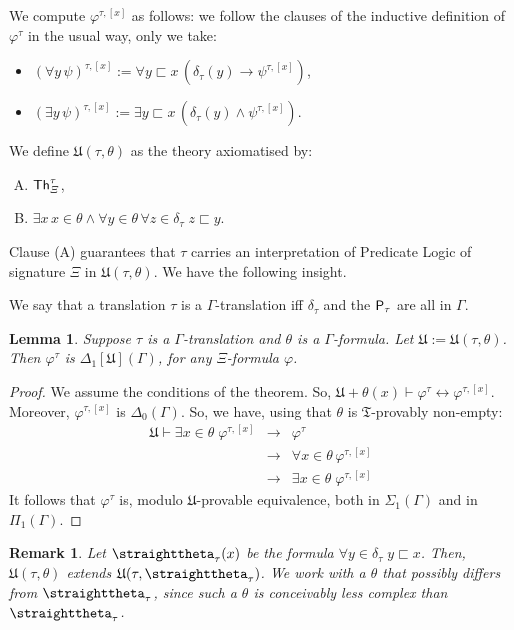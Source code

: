 \documentclass{amsart}
\renewcommand{\iff}{\leftrightarrow}
\renewcommand{\phi}{\varphi}
\renewcommand{\Xi}{\varXi}
\renewcommand{\Gamma}{\varGamma}
\newtheorem{lem}[theorem]{Lemma}
\newtheorem{rem}[theorem]{Remark}
\newcommand{\bin}{\mathbin{\in}}
\newcommand{\mf}[1]{{\mathfrak {#1}}}
\newcommand{\below}[2]{#1\sqsubset #2}
\newcommand{\bbelow}[2]{#1\mathop{\sqsubset}#2}
\newcommand{\contheta}{\text{\textup\straighttheta}}
\newcommand{\fol}[1]{{\sf Th}_{#1}}
\begin{document}
We compute $\phi^{\tau,[x]}$ as follows: we follow the clauses of the inductive definition
of $\phi^\tau$ in the usual way, only we take:
\begin{itemize}
    \item $(\forall y\,\psi)^{\tau,[x]} := \forall \bbelow yx\,(\delta_\tau(y) \to \psi^{\tau,[x]})$,
    \item $(\exists y\,\psi)^{\tau,[x]} := \exists \bbelow yx\,(\delta_\tau(y) \wedge \psi^{\tau,[x]})$.
\end{itemize}

We define $\mf U(\tau,\theta)$ as the theory axiomatised by:
\begin{enumerate}[A.]
    \item $\fol\Xi^\tau$,
    \item $ \exists x\, x\in\theta \wedge
    \forall  y \bin \theta\, \forall  z\bin \delta_\tau \; \below zy$. 
\end{enumerate}

Clause (A) guarantees that $\tau$ carries an interpretation of Predicate Logic of signature $\Xi$ in $\mf U(\tau,\theta)$.
We have the following insight.

We say that a translation $\tau$ is a $\Gamma$-translation iff $\delta_\tau$ and the ${\sf P}_\tau$
are all in $\Gamma$.
\begin{lem}\label{bescheidensmurf}
Suppose $\tau$ is a $\Gamma$-translation and $\theta$ is a $\Gamma$-formula.
Let $\mf U:= \mf U(\tau,\theta)$.
Then $\phi^\tau$ is $\Delta_1[\mf U](\Gamma)$, for any $\Xi$-formula $\phi$.
\end{lem}

\begin{proof}
    We assume the conditions of the theorem. So,
    $\mf U + \theta(x) \vdash \phi^{\tau}\iff \phi^{\tau,[x]}$. Moreover,
    $\phi^{\tau,[x]}$ is $\Delta_0(\Gamma)$. 
So, we have, using that $\theta$ is $\mf T$-provably non-empty:
\begin{eqnarray*}
    \mf U \vdash  \exists x \bin \theta\;  \phi^{\tau,[x]} & \to & \phi^\tau \\
    & \to & \forall x\bin \theta\,  \phi^{\tau,[x]} \\
    & \to &  \exists  x\bin\theta \;  \phi^{\tau,[x]}
\end{eqnarray*}
It follows that $\phi^\tau$ is, modulo $\mf U$-provable equivalence, both in $\Sigma_1(\Gamma)$ and in $\Pi_1(\Gamma)$.
\end{proof}

\begin{rem}
    Let   $\contheta_\tau(x)$ be the formula $\forall y \in \delta_\tau\;  \below yx$.
Then, $\mf U(\tau,\theta)$ extends $\mf U(\tau,\contheta_\tau)$.
We work with a $\theta$ that possibly differs from $\contheta_\tau$, since such a $\theta$ is conceivably less complex than $\contheta_\tau$.
\end{rem}
\end{document}
